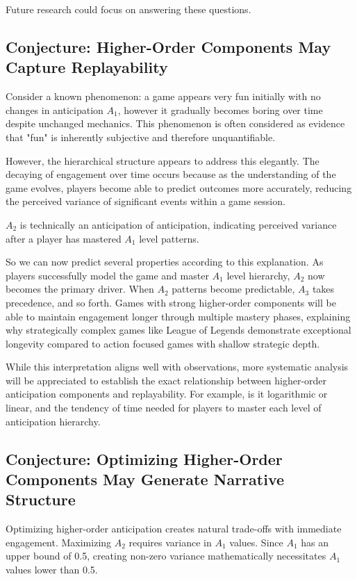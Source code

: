 \documentclass{article}
\begin{document}
Future research could focus on answering these questions.

\subsection{Conjecture: Higher-Order Components May Capture Replayability}

Consider a known phenomenon: a game appears very fun initially with no changes in anticipation $A_1$, however it gradually becomes boring over time despite unchanged mechanics. This phenomenon is often considered as evidence that "fun" is inherently subjective and therefore unquantifiable.

However, the hierarchical structure appears to address this elegantly. The decaying of engagement over time occurs because as the understanding of the game evolves, players become able to predict outcomes more accurately, reducing the perceived variance of significant events within a game session.

$A_2$ is technically an anticipation of anticipation, indicating perceived variance after a player has mastered $A_1$ level patterns.

So we can now predict several properties according to this explanation.
As players successfully model the game and master $A_1$ level hierarchy, $A_2$ now becomes the primary driver. When $A_2$ patterns become predictable, $A_3$ takes precedence, and so forth.
Games with strong higher-order components will be able to maintain engagement longer through multiple mastery phases, explaining why strategically complex games like League of Legends demonstrate exceptional longevity compared to action focused games with shallow strategic depth.

While this interpretation aligns well with observations, more systematic analysis will be appreciated to establish the exact relationship between higher-order anticipation components and replayability.
For example, is it logarithmic or linear, and the tendency of time needed for players to master each level of anticipation hierarchy.

\subsection{Conjecture: Optimizing Higher-Order Components May Generate Narrative Structure}

Optimizing higher-order anticipation creates natural trade-offs with immediate engagement. Maximizing $A_2$ requires variance in $A_1$ values. Since $A_1$ has an upper bound of 0.5, creating non-zero variance mathematically necessitates $A_1$ values lower than 0.5.
\end{document}
